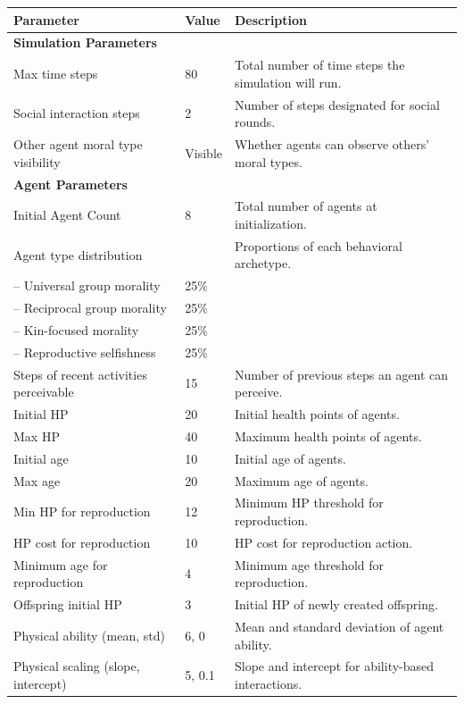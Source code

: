 \begin{table}[htbp]
\centering
\small
\begin{tabular}{lp{1.2cm}p{6.5cm}}
\hline
\textbf{Parameter} & \textbf{Value} & \textbf{Description} \\
\hline
\multicolumn{3}{l}{\textbf{Simulation Parameters}} \\
\hline
Max time steps & 80 & Total number of time steps the simulation will run. \\
Social interaction steps & 2 & Number of steps designated for social rounds. \\
Other agent moral type visibility & Visible & Whether agents can observe others' moral types. \\

\hline
\multicolumn{3}{l}{\textbf{Agent Parameters}} \\
\hline
Initial Agent Count & 8 & Total number of agents at initialization. \\
Agent type distribution &  & Proportions of each behavioral archetype. \\
-- Universal group morality & 25\% &  \\
-- Reciprocal group morality & 25\% &  \\
-- Kin-focused morality & 25\% &  \\
-- Reproductive selfishness & 25\% &  \\
Steps of recent activities perceivable & 15 & Number of previous steps an agent can perceive. \\
Initial HP & 20 & Initial health points of agents. \\
Max HP & 40 & Maximum health points of agents. \\
Initial age & 10 & Initial age of agents. \\
Max age & 20 & Maximum age of agents. \\
Min HP for reproduction & 12 & Minimum HP threshold for reproduction. \\
HP cost for reproduction & 10 & HP cost for reproduction action. \\
Minimum age for reproduction & 4 & Minimum age threshold for reproduction. \\
Offspring initial HP & 3 & Initial HP of newly created offspring. \\
Physical ability (mean, std) & 6, 0 & Mean and standard deviation of agent ability. \\
Physical scaling (slope, intercept) & 5, 0.1 & Slope and intercept for ability-based interactions. \\

\end{tabular}
\end{table}
